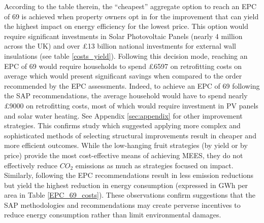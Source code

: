 According to the table therein, the “cheapest” aggregate option to reach an EPC of 69 is achieved when property owners opt in for the improvement that can yield the highest impact on energy efficiency for the lowest price. This option would require significant investments in Solar Photovoltaic Panels (nearly 4 million across the UK) and over £13 billion national investments for external wall insulations (see table \ref{costs_yield}). Following this decision mode, reaching an EPC of 69 would require households to spend £6597 on retrofitting costs on average which would present significant savings when compared to the order recommended by the EPC assessments. Indeed, to achieve an EPC of 69 following the SAP recommendations, the average household would have to spend nearly £9000 on retrofitting costs, most of which would require investment in PV panels and solar water heating. See Appendix \ref{sec:appendix} for other improvement strategies. This confirms \cite{billio_learning_2024} study which suggested applying more complex and sophisticated methods of selecting structural improvements result in cheaper and more efficient outcomes. While the low-hanging fruit strategies (by yield or by price) provide the most cost-effective means of achieving MEES, they do not effectively reduce $CO_2$ emissions as much as strategies focused on impact.  Similarly, following the EPC recommendations result in less emission reductions but yield the highest reduction in energy consumption (expressed in GWh per area in Table \ref{EPC_69_costs}). These observations confirm \cite{kelly_building_2012} suggestions that the SAP methodologies and recommendations may create perverse incentives to reduce energy consumption rather than limit environmental damages. \\
 
 
